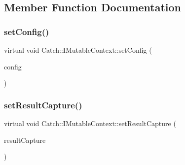 \subsection{Member Function Documentation}
\hypertarget{struct_catch_1_1_i_mutable_context_a013e8f688a8ea7970262d07ead542a63}{}\label{struct_catch_1_1_i_mutable_context_a013e8f688a8ea7970262d07ead542a63} 
\subsubsection{\texorpdfstring{set\+Config()}{setConfig()}}
{\footnotesize\ttfamily virtual void Catch\+::\+I\+Mutable\+Context\+::set\+Config (\begin{DoxyParamCaption}\item[{\hyperlink{class_catch_1_1_ptr}{Ptr}$<$ I\+Config const $>$ const \&}]{config }\end{DoxyParamCaption})\hspace{0.3cm}{\ttfamily [pure virtual]}}

\hypertarget{struct_catch_1_1_i_mutable_context_a4a80afd0525b7def21bee8d9b48f2d39}{}\label{struct_catch_1_1_i_mutable_context_a4a80afd0525b7def21bee8d9b48f2d39} 
\subsubsection{\texorpdfstring{set\+Result\+Capture()}{setResultCapture()}}
{\footnotesize\ttfamily virtual void Catch\+::\+I\+Mutable\+Context\+::set\+Result\+Capture (\begin{DoxyParamCaption}\item[{\hyperlink{struct_catch_1_1_i_result_capture}{I\+Result\+Capture} $\ast$}]{result\+Capture }\end{DoxyParamCaption})\hspace{0.3cm}{\ttfamily [pure virtual]}}

\hypertarget{struct_catch_1_1_i_mutable_context_af2e53b1dea4527a2587cff266a730f6e}{}\label{struct_catch_1_1_i_mutable_context_af2e53b1dea4527a2587cff266a730f6e} 

